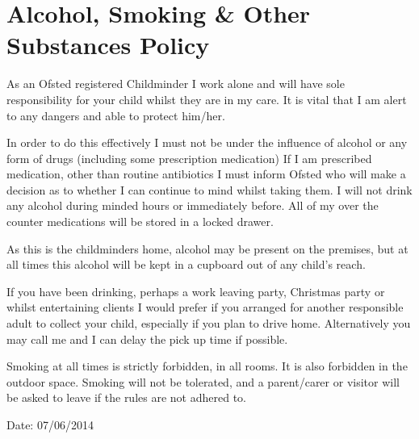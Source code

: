 
\section{Alcohol, Smoking \& Other Substances Policy}

As an Ofsted registered Childminder I work alone and will have sole
responsibility for your child whilst they are in my care. It is vital
that I am alert to any dangers and able to protect him/her.

In order to do this effectively I must not be under the influence of
alcohol or any form of drugs (including some prescription medication) If
I am prescribed medication, other than routine antibiotics I must inform
Ofsted who will make a decision as to whether I can continue to mind
whilst taking them. I will not drink any alcohol during minded hours or
immediately before. All of my over the counter medications will be
stored in a locked drawer.

As this is the childminders home, alcohol may be present on the
premises, but at all times this alcohol will be kept in a cupboard out
of any child's reach.

If you have been drinking, perhaps a work leaving party, Christmas party
or whilst entertaining clients I would prefer if you arranged for
another responsible adult to collect your child, especially if you plan
to drive home. Alternatively you may call me and I can delay the pick up
time if possible.

Smoking at all times is strictly forbidden, in all rooms. It is also
forbidden in the outdoor space. Smoking will not be tolerated, and a
parent/carer or visitor will be asked to leave if the rules are not
adhered to.

Date: 07/06/2014


